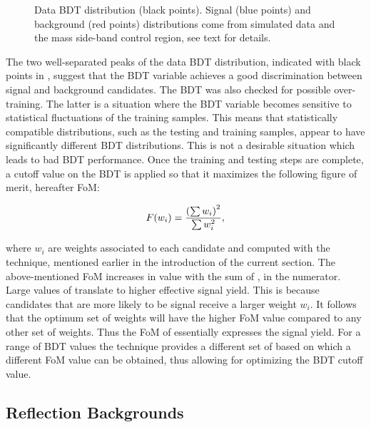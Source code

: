 \begin{figure}[!t]
\centering
  \scalebox{1}{}
  \caption{Data BDT distribution (black points). Signal (blue points) and background (red points) distributions
           come from simulated data and the \Bs mass side-band control region, see text for details.}
  \label{BTDG_performance}
\end{figure}

The two well-separated peaks of the data BDT distribution, indicated with black points in , suggest
that the BDT variable achieves a good discrimination between signal and background candidates.
The BDT was also checked for possible over-training. The latter is a situation where the BDT variable becomes sensitive
to statistical fluctuations of the training samples. This means that statistically compatible distributions, such as
the testing and training samples, appear to have significantly different BDT distributions. This is not a desirable
situation which leads to bad BDT performance. Once the training and testing steps are complete, a cutoff value on the
BDT is applied so that it maximizes the following figure of merit, hereafter FoM:

\begin{equation}
  \centering
  F(w_i) = \frac{\left(\sum{w_{i}}\right)^2}{\sum{w_{i}^2}},
\label{eqn:fom}
\end{equation}

\noindent where $w_i$ are weights associated to each candidate and computed with the \sPlot technique,
mentioned earlier in the introduction of the current section. The above-mentioned FoM increases in value with
the sum of \sWeights, in the numerator. Large values of \sWeights translate to higher effective signal yield.
This is because candidates that are more likely to be signal receive a larger weight $w_i$. It follows that the
optimum set of weights will have the higher FoM value compared to any other set of weights. Thus the FoM
of  essentially expresses the signal yield. For a range of BDT values the \sPlot technique
provides a different set of \sWeights based on which a different FoM value can be obtained, thus allowing for
optimizing the BDT cutoff value.

\subsection{Reflection Backgrounds}
\label{peaking_backgrounds}

